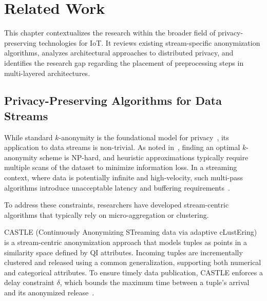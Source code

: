 \chapter{Related Work}

This chapter contextualizes the research within the broader field of privacy-preserving technologies for \ac{IoT}. It reviews existing stream-specific anonymization algorithms, analyzes architectural approaches to distributed privacy, and identifies the research gap regarding the placement of preprocessing steps in multi-layered architectures.

\section{Privacy-Preserving Algorithms for Data Streams}
While standard $k$-anonymity is the foundational model for privacy~\cite{Sweeney_kanon}, its application to data streams is non-trivial. As noted in~\cite{meyerson2004complexity}, finding an optimal $k$-anonymity scheme is NP-hard, and heuristic approximations typically require multiple scans of the dataset to minimize information loss. In a streaming context, where data is potentially infinite and high-velocity, such multi-pass algorithms introduce unacceptable latency and buffering requirements~\cite{AnonymizationDataStreams}.



To address these constraints, researchers have developed stream-centric algorithms that typically rely on micro-aggregation or clustering.


CASTLE (Continuously Anonymizing STreaming data via adaptive cLustEring) is a stream-centric anonymization approach that models tuples as points in a similarity space defined by \ac{QI} attributes. Incoming tuples are incrementally clustered and released using a common generalization, supporting both numerical and categorical attributes. To ensure timely data publication, CASTLE enforces a delay constraint $\delta$, which bounds the maximum time between a tuple’s arrival and its anonymized release~\cite{CASTLE}.

